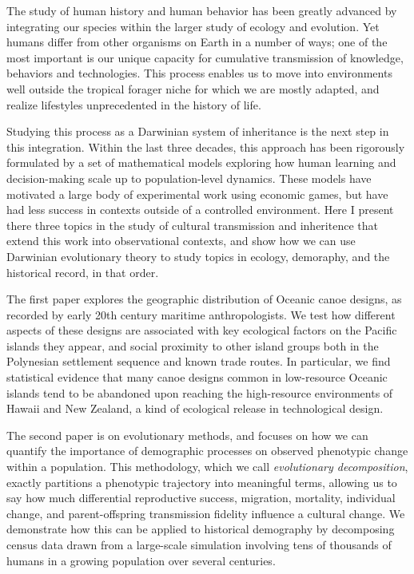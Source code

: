 

The study of human history and human behavior has been greatly advanced by integrating our species within the larger study of ecology and evolution.  Yet humans differ from other organisms on Earth in a number of ways; one of the most important is our unique capacity for cumulative transmission of knowledge, behaviors and technologies. This process enables us to move into environments well outside the tropical forager niche for which we are mostly adapted, and realize lifestyles unprecedented in the history of life.  

Studying this process as a Darwinian system of inheritance is the next step in this integration.  Within the last three decades, this approach has been rigorously formulated by a set of mathematical models exploring how human learning and decision-making scale up to population-level dynamics.  These models have motivated a large body of experimental work using economic games, but have had less success in contexts outside of a controlled environment.  Here I present there three topics in the study of cultural transmission and inheritence that extend this work into observational contexts, and show how we can use Darwinian evolutionary theory to study topics in ecology, demoraphy, and the historical record, in that order.  

The first paper explores the geographic distribution of Oceanic canoe designs, as recorded by early 20th century maritime anthropologists.  We test how different aspects of these designs are associated with key ecological factors on the Pacific islands they appear, and social proximity to other island groups both in the Polynesian settlement sequence and known trade routes.  In particular, we find statistical evidence that many canoe designs common in low-resource Oceanic islands tend to be abandoned upon reaching the high-resource environments of Hawaii and New Zealand, a kind of ecological release in technological design.  

The second paper is on evolutionary methods, and focuses on how we can quantify the importance of demographic processes on observed phenotypic change within a population.  This methodology, which we call \textit{evolutionary decomposition}, exactly partitions a phenotypic trajectory into meaningful terms, allowing us to say how much differential reproductive success, migration, mortality, individual change, and parent-offspring transmission fidelity influence a cultural change.  We demonstrate how this can be applied to historical demography by decomposing census data drawn from a large-scale simulation involving tens of thousands of humans in a growing population over several centuries.

